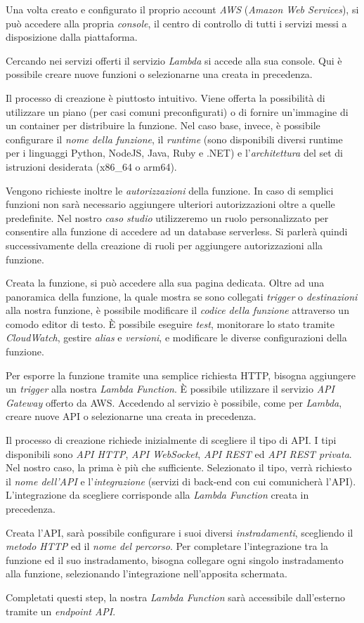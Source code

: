 Una volta creato e configurato il proprio account \textit{AWS} (\textit{Amazon Web Services}), si può accedere alla propria \textit{console}, il centro di controllo di tutti i servizi messi a disposizione dalla piattaforma.

Cercando nei servizi offerti il servizio \textit{Lambda} si accede alla sua console. Qui è possibile creare nuove funzioni o selezionarne una creata in precedenza.

Il processo di creazione è piuttosto intuitivo. Viene offerta la possibilità di utilizzare un piano (per casi comuni preconfigurati) o di fornire un'immagine di un container per distribuire la funzione. Nel caso base, invece, è possibile configurare il \textit{nome della funzione}, il \textit{runtime} (sono disponibili diversi runtime per i linguaggi Python, NodeJS, Java, Ruby e .NET) e l'\textit{architettura} del set di istruzioni desiderata (x86\_64 o arm64).

Vengono richieste inoltre le \textit{autorizzazioni} della funzione. In caso di semplici funzioni non sarà necessario aggiungere ulteriori autorizzazioni oltre a quelle predefinite. Nel nostro \textit{caso studio} utilizzeremo un ruolo personalizzato per consentire alla funzione di accedere ad un database serverless. Si parlerà quindi successivamente della creazione di ruoli per aggiungere autorizzazioni alla funzione.

Creata la funzione, si può accedere alla sua pagina dedicata. Oltre ad una panoramica della funzione, la quale mostra se sono collegati \textit{trigger} o \textit{destinazioni} alla nostra funzione, è possibile modificare il \textit{codice della funzione} attraverso un comodo editor di testo. È possibile eseguire \textit{test}, monitorare lo stato tramite \textit{CloudWatch}, gestire \textit{alias} e \textit{versioni}, e modificare le diverse configurazioni della funzione.

Per esporre la funzione tramite una semplice richiesta HTTP, bisogna aggiungere un \textit{trigger} alla nostra \textit{Lambda Function}. È possibile utilizzare il servizio \textit{API Gateway} offerto da AWS. Accedendo al servizio è possibile, come per \textit{Lambda}, creare nuove API o selezionarne una creata in precedenza.

Il processo di creazione richiede inizialmente di scegliere il tipo di API. I tipi disponibili sono \textit{API HTTP}, \textit{API WebSocket}, \textit{API REST} ed \textit{API REST privata}. Nel nostro caso, la prima è più che sufficiente.
Selezionato il tipo, verrà richiesto il \textit{nome dell'API} e l'\textit{integrazione} (servizi di back-end con cui comunicherà l'API). L'integrazione da scegliere corrisponde alla \textit{Lambda Function} creata in precedenza.

Creata l'API, sarà possibile configurare i suoi diversi \textit{instradamenti}, scegliendo il \textit{metodo HTTP} ed il \textit{nome del percorso}. Per completare l'integrazione tra la funzione ed il suo instradamento, bisogna collegare ogni singolo instradamento alla funzione, selezionando l'integrazione nell'apposita schermata.

Completati questi step, la nostra \textit{Lambda Function} sarà accessibile dall'esterno tramite un \textit{endpoint API}.